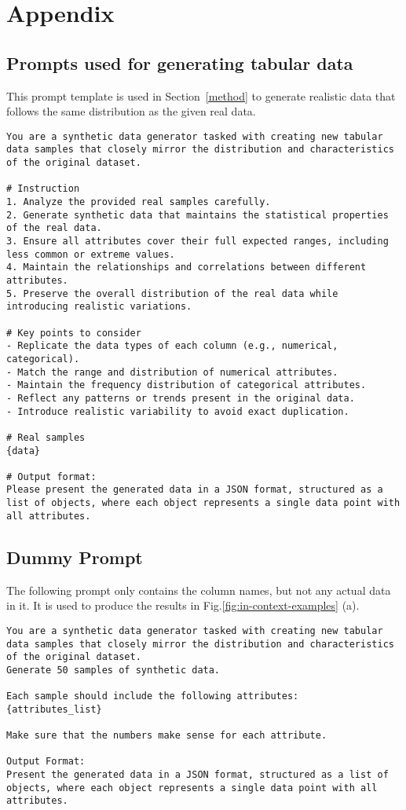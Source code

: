 \onecolumn
\section{Appendix} \label{sec:appendix}

\subsection{Prompts used for generating tabular data} \label{lst:prompt}
This prompt template is used in Section~\ref{method} to generate realistic data that follows the same distribution as the given real data.

\begin{lstlisting} 
You are a synthetic data generator tasked with creating new tabular data samples that closely mirror the distribution and characteristics of the original dataset.

# Instruction
1. Analyze the provided real samples carefully.
2. Generate synthetic data that maintains the statistical properties of the real data.
3. Ensure all attributes cover their full expected ranges, including less common or extreme values.
4. Maintain the relationships and correlations between different attributes.
5. Preserve the overall distribution of the real data while introducing realistic variations.

# Key points to consider
- Replicate the data types of each column (e.g., numerical, categorical).
- Match the range and distribution of numerical attributes.
- Maintain the frequency distribution of categorical attributes.
- Reflect any patterns or trends present in the original data.
- Introduce realistic variability to avoid exact duplication.

# Real samples
{data}

# Output format:
Please present the generated data in a JSON format, structured as a list of objects, where each object represents a single data point with all attributes.

\end{lstlisting}

\subsection{Dummy Prompt} \label{appendix:dummy_prompt}
The following prompt only contains the column names, but not any actual data in it. It is used to produce the results in Fig.\ref{fig:in-context-examples} (a).
\begin{lstlisting}
You are a synthetic data generator tasked with creating new tabular data samples that closely mirror the distribution and characteristics of the original dataset.
Generate 50 samples of synthetic data.
    
Each sample should include the following attributes:
{attributes_list}

Make sure that the numbers make sense for each attribute. 

Output Format:
Present the generated data in a JSON format, structured as a list of objects, where each object represents a single data point with all attributes.

\end{lstlisting}


